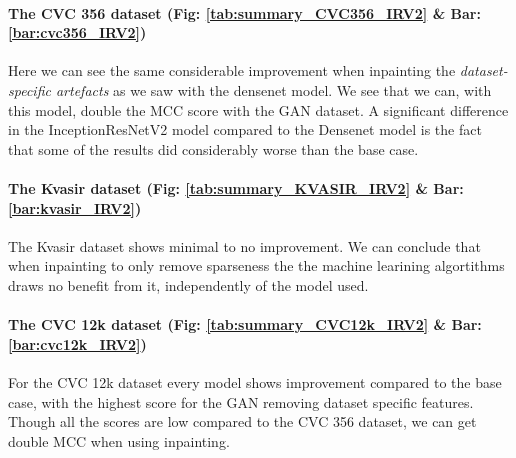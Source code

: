 \paragraph{The CVC 356 dataset (Fig: \ref{tab:summary_CVC356_IRV2} \& Bar: \ref{bar:cvc356_IRV2})}
Here we can see the same considerable improvement when inpainting the \textit{dataset-specific artefacts} as we saw with the densenet model. We see that we can, with this model, double the MCC score with the GAN dataset.
A significant difference in the InceptionResNetV2 model compared to the Densenet model is the fact that some of the results did considerably worse than the base case. 

\paragraph{The Kvasir dataset (Fig: \ref{tab:summary_KVASIR_IRV2} \& Bar: \ref{bar:kvasir_IRV2})}
The Kvasir dataset shows minimal to no improvement. We can conclude that when inpainting to only remove sparseness the the machine learining algortithms draws no benefit from it, independently of the model used.

\paragraph{The CVC 12k dataset (Fig: \ref{tab:summary_CVC12k_IRV2} \& Bar: \ref{bar:cvc12k_IRV2})}
For the CVC 12k dataset every model shows improvement compared to the base case, with the highest score for the GAN removing dataset specific features. Though all the scores are low compared to the CVC 356 dataset, we can get double MCC when using inpainting.


